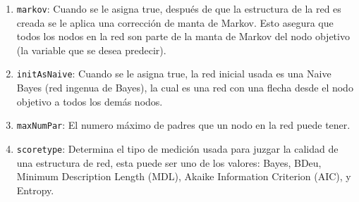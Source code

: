 \begin{enumerate}
	\item \texttt{markov}: Cuando se le asigna true, después de que la estructura de la red es creada se le
		aplica una corrección de manta de Markov. Esto asegura que todos los nodos en la red son parte de la
		manta de Markov del nodo objetivo (la variable que se desea predecir).
	\item \texttt{initAsNaive}: Cuando se le asigna true, la red inicial usada es una Naive Bayes (red ingenua de Bayes), la cual es una red con una flecha desde el nodo objetivo a todos los demás nodos.
	\item \texttt{maxNumPar}: El numero máximo de padres que un nodo en la red puede tener.
	\item \texttt{scoretype}: Determina el tipo de medición usada para juzgar la calidad de una estructura de
			red, esta puede ser uno de los valores: Bayes, BDeu, Minimum Description Length (MDL), Akaike 
			Information Criterion (AIC), y Entropy.
\end{enumerate}


